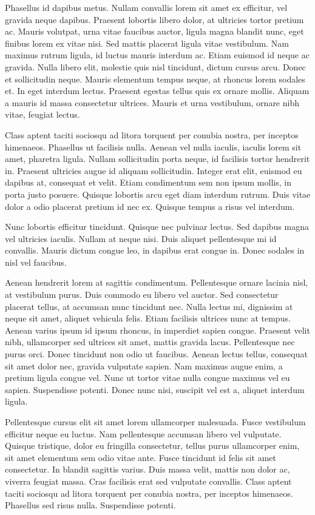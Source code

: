 Phasellus id dapibus metus. Nullam convallis lorem sit amet ex efficitur, vel gravida neque dapibus. Praesent lobortis libero dolor, at ultricies tortor pretium ac. Mauris volutpat, urna vitae faucibus auctor, ligula magna blandit nunc, eget finibus lorem ex vitae nisi. Sed mattis placerat ligula vitae vestibulum. Nam maximus rutrum ligula, id luctus mauris interdum ac. Etiam euismod id neque ac gravida. Nulla libero elit, molestie quis nisl tincidunt, dictum cursus arcu. Donec et sollicitudin neque. Mauris elementum tempus neque, at rhoncus lorem sodales et. In eget interdum lectus. Praesent egestas tellus quis ex ornare mollis. Aliquam a mauris id massa consectetur ultrices. Mauris et urna vestibulum, ornare nibh vitae, feugiat lectus.


Class aptent taciti sociosqu ad litora torquent per conubia nostra, per inceptos himenaeos. Phasellus ut facilisis nulla. Aenean vel nulla iaculis, iaculis lorem sit amet, pharetra ligula. Nullam sollicitudin porta neque, id facilisis tortor hendrerit in. Praesent ultricies augue id aliquam sollicitudin. Integer erat elit, euismod eu dapibus at, consequat et velit. Etiam condimentum sem non ipsum mollis, in porta justo posuere. Quisque lobortis arcu eget diam interdum rutrum. Duis vitae dolor a odio placerat pretium id nec ex. Quisque tempus a risus vel interdum.

Nunc lobortis efficitur tincidunt. Quisque nec pulvinar lectus. Sed dapibus magna vel ultricies iaculis. Nullam at neque nisi. Duis aliquet pellentesque mi id convallis. Mauris dictum congue leo, in dapibus erat congue in. Donec sodales in nisl vel faucibus.

Aenean hendrerit lorem at sagittis condimentum. Pellentesque ornare lacinia nisl, at vestibulum purus. Duis commodo eu libero vel auctor. Sed consectetur placerat tellus, at accumsan nunc tincidunt nec. Nulla lectus mi, dignissim at neque sit amet, aliquet vehicula felis. Etiam facilisis ultrices nunc at tempus. Aenean varius ipsum id ipsum rhoncus, in imperdiet sapien congue. Praesent velit nibh, ullamcorper sed ultrices sit amet, mattis gravida lacus. Pellentesque nec purus orci. Donec tincidunt non odio ut faucibus. Aenean lectus tellus, consequat sit amet dolor nec, gravida vulputate sapien. Nam maximus augue enim, a pretium ligula congue vel. Nunc ut tortor vitae nulla congue maximus vel eu sapien. Suspendisse potenti. Donec nunc nisi, suscipit vel est a, aliquet interdum ligula.

Pellentesque cursus elit sit amet lorem ullamcorper malesuada. Fusce vestibulum efficitur neque eu luctus. Nam pellentesque accumsan libero vel vulputate. Quisque tristique, dolor eu fringilla consectetur, tellus purus ullamcorper enim, sit amet elementum sem odio vitae ante. Fusce tincidunt id felis sit amet consectetur. In blandit sagittis varius. Duis massa velit, mattis non dolor ac, viverra feugiat massa. Cras facilisis erat sed vulputate convallis. Class aptent taciti sociosqu ad litora torquent per conubia nostra, per inceptos himenaeos. Phasellus sed risus nulla. Suspendisse potenti.

